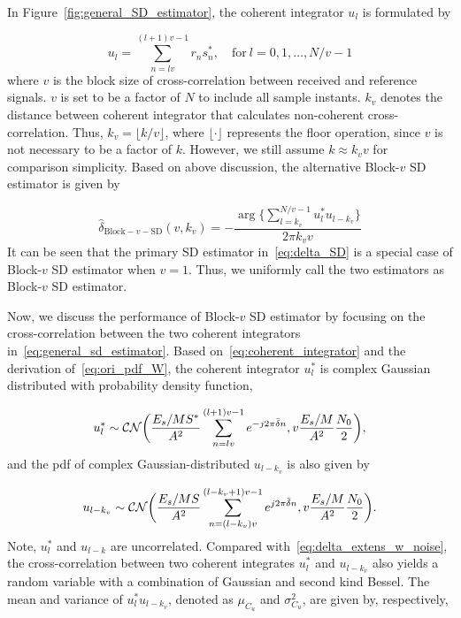 In Figure~\ref{fig:general_SD_estimator}, the coherent integrator $u_l$ is formulated by

\begin{equation}
  \label{eq:coherent_integrator}
  u_l=\sum_{n=lv}^{(l+1)v-1}r_ns_n^*, \quad \text{for}~l=0,1,\ldots,N/v-1
\end{equation}
where $v$ is the block size of cross-correlation between received and reference signals. $v$ is set to be a factor of $N$
to include all sample instants.
$k_v$ denotes the distance between coherent integrator that calculates non-coherent cross-correlation.
Thus, $k_v=\lfloor k/v \rfloor$, where $\lfloor \cdot \rfloor$ represents the floor operation, since $v$ is not necessary to be a factor of $k$.
However, we still assume $k\approx k_vv$ for comparison simplicity. Based on above discussion, the alternative Block-$v$ SD estimator is given by

\begin{equation}
  \label{eq:general_sd_estimator}
  \hat{\delta}_{\text{Block}-v-\text{SD}}(v,k_v)=-\frac{\arg\big\{\sum_{l=k_v}^{N/v-1}u_l^*u_{l-k_v}\big\}}{2\pi k_vv}
\end{equation}
It can be seen that the primary SD estimator in~\eqref{eq:delta_SD} is a special case of Block-$v$ SD estimator when $v=1$.
Thus, we uniformly call the two estimators as Block-$v$ SD estimator.

Now, we discuss the performance of Block-$v$ SD estimator by focusing on the cross-correlation between the two coherent integrators in~\eqref{eq:general_sd_estimator}.
Based on~\eqref{eq:coherent_integrator} and the derivation of~\eqref{eq:ori_pdf_W}, the coherent integrator $u_l^*$ is complex Gaussian distributed with probability density function,

\begin{equation*}
  \label{eq:pdf_co_integrator_1}
  u_l^* \sim \mathcal{CN}\bigg(\frac{E_s/MS^*}{A^2}\sum_{n=lv}^{(l+1)v-1}e^{-j2\pi \bar{\delta}n},v\frac{E_s/M}{A^2}\frac{N_0}{2}\bigg),
\end{equation*}
and the pdf of complex Gaussian-distributed $u_{l-k_v}$ is also given by

\begin{equation*}
  \label{eq:pdf_co_integrator_2}
  u_{l-k_v} \sim \mathcal{CN}\bigg(\frac{E_s/MS}{A^2}\sum_{n=(l-k_v)v}^{(l-k_v+1)v-1}e^{j2\pi \bar{\delta}n},v\frac{E_s/M}{A^2}\frac{N_0}{2}\bigg).
\end{equation*}
Note, $u_l^*$ and $u_{l-k}$ are uncorrelated. Compared with~\eqref{eq:delta_extens_w_noise}, the cross-correlation between two coherent integrates $u_l^*$ and $u_{l-k_v}$ also yields a random variable
with a combination of Gaussian and second kind Bessel. The mean and variance of $u_l^*u_{l-k_v}$, denoted as $\mu_{C_u}$ and $\sigma^2_{C_u}$, are given by, respectively,

